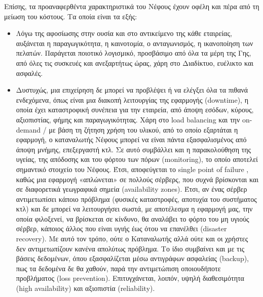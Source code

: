 \documentclass{article}
\begin{document}
Επίσης, τα προαναφερθέντα χαρακτηριστικά του Νέφους έχουν οφέλη και πέρα από τη μείωση του κόστους. Τα οποία είναι τα εξής:
\begin{itemize}
\item	Λόγω της αφοσίωσης στην ουσία και στο αντικείμενο της κάθε εταιρείας, αυξάνεται η παραγωγικότητα, η καινοτομία, ο ανταγωνισμός, η ικανοποίηση των πελατών. Παράγεται ποιοτικό λογισμικό, προσβάσιμο από όλα τα μέρη της Γης, από όλες τις συσκευές και ανεξαρτήτως ώρας, χάρη στο Διαδίκτυο, ευέλικτο και ασφαλές.

\item	Δυστυχώς, μια επιχείρηση δε μπορεί να προβλέψει ή να ελέγξει όλα τα πιθανά ενδεχόμενα, όπως είναι μια διακοπή λειτουργίας της εφαρμογής (downtime), η οποία έχει καταστροφική συνέπεια για την εταιρεία, από άποψη εσόδων, κύρους, αξιοπιστίας, φήμης και παραγωγικότητας. Χάρη στο load balancing και την on-demand / με βάση τη ζήτηση χρήση του υλικού, από το οποίο εξαρτάται η εφαρμογή, ο καταναλωτής Νέφους μπορεί να είναι πάντα εξασφαλισμένος από άποψη μνήμης, επεξεργαστή κτλ. Σε αυτό συμβάλλει και η παρακολούθηση της υγείας, της απόδοσης και του φόρτου των πόρων (monitoring), το οποίο αποτελεί σημαντικό στοιχείο του Νέφους. Έτσι, αποφεύγεται το single point of failure , καθώς μια εφαρμογή «απλώνεται» σε πολλούς σέρβερς, που συχνά βρίσκονται και σε διαφορετικά γεωγραφικά σημεία (availability zones). Έτσι, αν ένας σέρβερ αντιμετωπίσει κάποιο πρόβλημα (φυσικές καταστροφές, αποτυχία του συστήματος κτλ) και δε μπορεί να λειτουργήσει σωστά, με αποτέλεσμα η εφαρμογή μας, την οποία φιλοξενεί, να βρίσκεται σε κίνδυνο, θα αναλάβει το φόρτο του μη υγιούς σέρβερ, κάποιος άλλος που είναι υγιής έως ότου να επανέλθει (disaster recovery). Με αυτό τον τρόπο, ούτε ο Καταναλωτής αλλά ούτε και οι χρήστες δεν αντιμετωπίζουν κανένα απολύτως πρόβλημα. Το ίδιο συμβαίνει και με τις βάσεις δεδομένων, όπου εξασφαλίζεται μέσω αντιγράφων ασφαλείας (backup), πως τα δεδομένα δε θα χαθούν, παρά την αντιμετώπιση οποιουδήποτε προβλήματος (loss prevention). Επιτυγχάνεται, λοιπόν, υψηλή διαθεσιμότητα (high availability) και αξιοπιστία (reliability).


\end{itemize}
\end{document}
